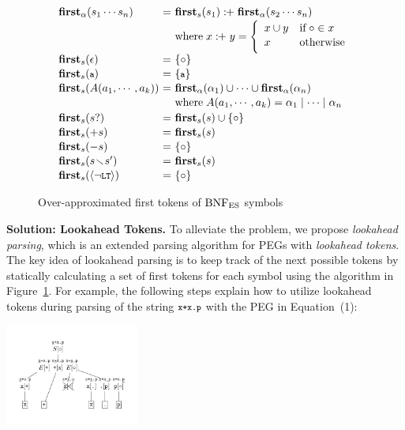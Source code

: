 \begin{figure}[t]
\centering
\small
\[
  \begin{array}{l@{~}c@{~}l}
    \rhsfirst{\symb_1 \cdots \symb_n} &=& \symbfirst{\symb_1} \firstplus
    \rhsfirst{\symb_2 \cdots \symb_n}\\[.1em]
    && \text{where} \; x \firstplus y = \left\{
    \begin{array}{ll}
      x \cup y & \text{if} \; \emptyfirst \in x\\[.1em]
      x & \text{otherwise}\\[.2em]
    \end{array}
    \right.\\[.1em]
    \symbfirst{\epsilon} &=& \{ \emptyfirst \}\\[.1em]
    \symbfirst{\T{a}} &=& \{ \T{a} \} \\[.1em]
    \symbfirst{\NT{A}(\argument_1, \cdots, \argument_k)} &=&
    \rhsfirst{\rhs_1} \cup \cdots \cup \rhsfirst{\rhs_n}\\[.1em]
    && \text{where} \; \NT{A}(\argument_1, \cdots, \argument_k) =
    \rhs_1 \mid \cdots \mid \rhs_n\\[.2em]
    \symbfirst{\symb?} &=& \symbfirst{\symb} \cup \{ \emptyfirst \}\\[.1em]
    \symbfirst{+\symb} &=& \symbfirst{\symb}\\[.1em]
    \symbfirst{-\symb} &=& \{ \emptyfirst \}\\[.1em]
    \symbfirst{\symb \butnot \symb'} &=& \symbfirst{\symb}\\[.1em]
    \symbfirst{\nolt} &=& \{ \emptyfirst \}
  \end{array}
\]
\caption{Over-approximated first tokens of \( \text{BNF}_{\text{ES}} \) symbols}
\label{fig:first-tokens}
\vspace{-1em}
\end{figure}

\smallskip

\textbf{Solution: Lookahead Tokens.}
To alleviate the problem, we propose \textit{lookahead parsing}, which is an
extended parsing algorithm for PEGs with \textit{lookahead tokens}.  The key
idea of lookahead parsing is to keep track of the next possible tokens by
statically calculating a set of first tokens for each symbol using the algorithm in
Figure~\ref{fig:first-tokens}.  For example, the following steps explain how to
utilize lookahead tokens during parsing of the string \( \texttt{\footnotesize x+x.p} \) with
the PEG in Equation~(1):\\[-.5em]
\begin{center}
  \includegraphics[width=0.33\textwidth]{img/laparser.pdf}
\end{center}

